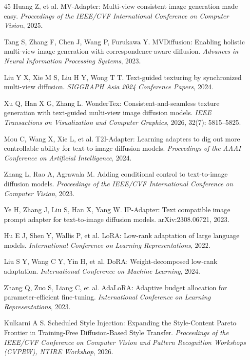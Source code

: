 \documentclass[times,twocolumn,final]{elsarticle}
\providecommand{\DIFadd}[1]{{\protect\color{blue} \sf #1}} %
\providecommand{\DIFaddbegin}{} %
\providecommand{\DIFaddend}{} %
\begin{document}
\begin{thebibliography}{45}
Huang Z, et al. MV-Adapter: Multi-view consistent image generation made easy. \textit{Proceedings of the IEEE/CVF International Conference on Computer Vision}, 2025.

\DIFaddbegin {}
\DIFadd{Tang S, Zhang F, Chen J, Wang P, Furukawa Y. MVDiffusion: Enabling holistic multi-view image generation with correspondence-aware diffusion. \textit{Advances in Neural Information Processing Systems}, 2023.
}

\DIFaddend {}
Liu Y X, Xie M S, Liu H Y, Wong T T. Text-guided texturing by synchronized multi-view diffusion. \textit{SIGGRAPH Asia 2024 Conference Papers}, 2024.

Xu Q, Han X G, Zhang L. WonderTex: Consistent-and-seamless texture generation with text-guided multi-view image diffusion models. \textit{IEEE Transactions on Visualization and Computer Graphics}, 2026, 32(7): 5815--5825.

Mou C, Wang X, Xie L, et al. T2I-Adapter: Learning adapters to dig out more controllable ability for text-to-image diffusion models. \textit{Proceedings of the AAAI Conference on Artificial Intelligence}, 2024.

Zhang L, Rao A, Agrawala M. Adding conditional control to text-to-image diffusion models. \textit{Proceedings of the IEEE/CVF International Conference on Computer Vision}, 2023.

Ye H, Zhang J, Liu S, Han X, Yang W. IP-Adapter: Text compatible image prompt adapter for text-to-image diffusion models. arXiv:2308.06721, 2023.

Hu E J, Shen Y, Wallis P, et al. LoRA: Low-rank adaptation of large language models. \textit{International Conference on Learning Representations}, 2022.

Liu S Y, Wang C Y, Yin H, et al. DoRA: Weight-decomposed low-rank adaptation. \textit{International Conference on Machine Learning}, 2024.

Zhang Q, Zuo S, Liang C, et al. AdaLoRA: Adaptive budget allocation for parameter-efficient fine-tuning. \textit{International Conference on Learning Representations}, 2023.

\DIFaddbegin {}
\DIFadd{Kulkarni A S. Scheduled Style Injection: Expanding the Style-Content Pareto Frontier in Training-Free Diffusion-Based Style Transfer. \textit{Proceedings of the IEEE/CVF Conference on Computer Vision and Pattern Recognition Workshops (CVPRW), NTIRE Workshop}, 2026.
}


\end{thebibliography}
\end{document}
